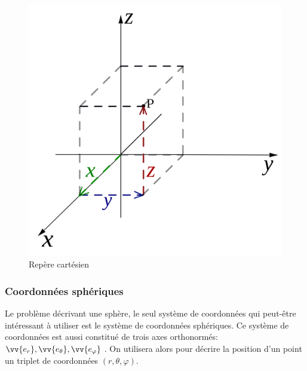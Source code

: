 \documentclass[fleqn]{article}
\renewcommand{\phi}{\varphi}
\begin{document}
\begin{figure}[H]
    \centering
    \includegraphics[width = 0.3\paperwidth]{images/Rectangular_coordinates.svg.png}
    \caption{Repère cartésien}
\end{figure}

\subsubsection{Coordonnées sphériques}
Le problème décrivant une sphère, le seul système de coordonnées qui peut-être intéressant à utiliser est le système de coordonnées sphériques. Ce système de coordonnées est aussi constitué de trois axes orthonormés:$\vv{e_r}, \vv{e_\theta}, \vv{e_\phi}$ . On utilisera alors pour décrire la position d'un point un triplet de coordonnées $(r, \theta, \phi)$. 
\end{document}
